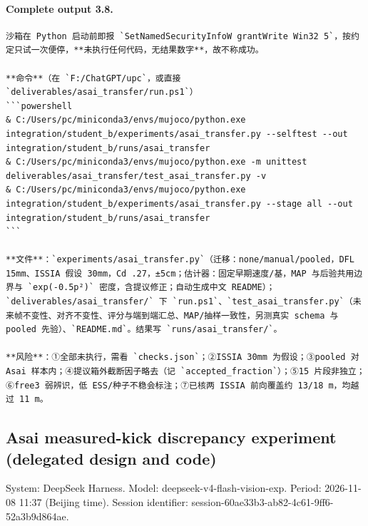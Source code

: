 \documentclass[UTF8,10pt]{ctexart}
\begin{document}
\paragraph{Complete output 3.8.}
\begin{Verbatim}[breaklines=true,breakanywhere=true,fontsize=\scriptsize,frame=single,framesep=2pt]
沙箱在 Python 启动前即报 `SetNamedSecurityInfoW grantWrite Win32 5`，按约定只试一次便停，**未执行任何代码，无结果数字**，故不称成功。

**命令**（在 `F:/ChatGPT/upc`，或直接 `deliverables/asai_transfer/run.ps1`）
```powershell
& C:/Users/pc/miniconda3/envs/mujoco/python.exe integration/student_b/experiments/asai_transfer.py --selftest --out integration/student_b/runs/asai_transfer
& C:/Users/pc/miniconda3/envs/mujoco/python.exe -m unittest deliverables/asai_transfer/test_asai_transfer.py -v
& C:/Users/pc/miniconda3/envs/mujoco/python.exe integration/student_b/experiments/asai_transfer.py --stage all --out integration/student_b/runs/asai_transfer
```

**文件**：`experiments/asai_transfer.py`（迁移：none/manual/pooled，DFL 15mm、ISSIA 假设 30mm，Cd .27，±5cm；估计器：固定早期速度/基，MAP 与后验共用边界与 `exp(-0.5p²)` 密度，含提议修正；自动生成中文 README）；`deliverables/asai_transfer/` 下 `run.ps1`、`test_asai_transfer.py`（未来帧不变性、对齐不变性、评分与端到端汇总、MAP/抽样一致性，另测真实 schema 与 pooled 先验）、`README.md`。结果写 `runs/asai_transfer/`。

**风险**：①全部未执行，需看 `checks.json`；②ISSIA 30mm 为假设；③pooled 对 Asai 样本内；④提议箱外截断因子略去（记 `accepted_fraction`）；⑤15 片段非独立；⑥free3 弱辨识，低 ESS/种子不稳会标注；⑦已核两 ISSIA 前向覆盖约 13/18 m，均越过 11 m。
\end{Verbatim}

\subsection*{Asai measured-kick discrepancy experiment (delegated design and code)}
\noindent System: DeepSeek Harness. Model: deepseek-v4-flash-vision-exp. Period: 2026-11-08 11:37 (Beijing time). Session identifier: session-60ae33b3-ab82-4c61-9ff6-52a3b9d864ae.
\end{document}
